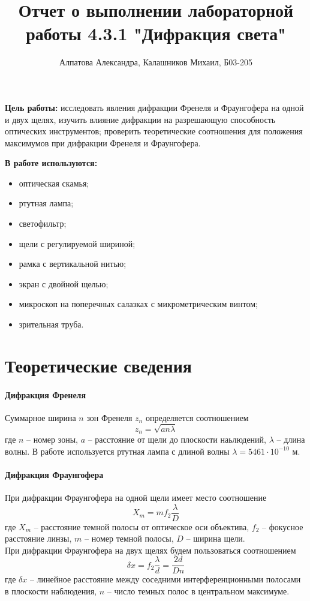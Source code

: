\documentclass[14pt, a4paper]{report}
\title{\textbf{Отчет о выполнении лабораторной работы 4.3.1 "Дифракция света"}}
\author{Алпатова Александра, Калашников Михаил, Б03-205}
\date{}
\begin{document}
\maketitle

\textbf{Цель работы:}
исследовать явления дифракции Френеля и Фраунгофера на одной и двух щелях, изучить влияние дифракции на разрешающую способность оптических инструментов; проверить теоретические соотношения для положения максимумов при дифракции Френеля и Фраунгофера.
\newline

\textbf{В работе используются:}
\begin{itemize}
\item оптическая скамья;
\item ртутная лампа;
\item светофильтр;
\item щели с регулируемой шириной;
\item рамка с вертикальной нитью;
\item экран с двойной щелью;
\item микроскоп на поперечных салазках с микрометрическим винтом;
\item зрительная труба.
\end{itemize}

\section{Теоретические сведения}

\paragraph{Дифракция Френеля}
Суммарное ширина $n$ зон Френеля $z_n$ определяется соотношением 
\begin{equation}
    z_n = \sqrt{an\lambda}
\end{equation}
где $n$ -- номер зоны, $a$ -- расстояние от щели до плоскости наьлюдений, $\lambda$ -- длина волны. В работе используется ртутная лампа с длиной волны $\lambda = 5461 \cdot 10^{-10}$ м.

\paragraph{Дифракция Фраунгофера}
При дифракции Фраунгофера на одной щели имеет место соотношение
\begin{equation}
    X_m = m f_2 \frac{\lambda}{D}
\end{equation}
где $X_m$ -- расстояние темной полосы от оптическое оси объектива, $f_2$ -- фокусное расстояние линзы, $m$ -- номер темной полосы, $D$ -- ширина щели. \\
При дифракции Фраунгофера на двух щелях будем пользоваться соотношением 
\begin{equation}
    \delta x = f_2 \frac{\lambda}{d} = \frac{2d}{Dn}
\end{equation}
где $\delta x$ -- линейное расстояние между соседними интерференционными полосами в плоскости наблюдения, $n$ -- число темных полос в центральном максимуме.
\end{document}
